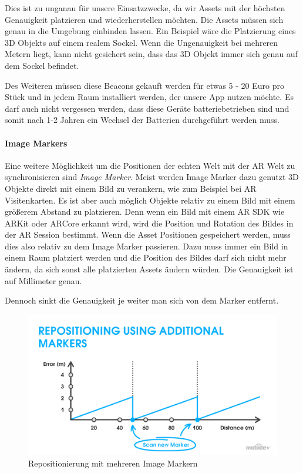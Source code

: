 \documentclass[titlepage, a4paper, 11pt]{scrartcl}
\begin{document}
  Dies ist zu unganau für unsere Einsatzzwecke, da wir Assets mit der höchsten Genauigkeit platzieren und wiederherstellen möchten. Die Assets müssen sich genau in die Umgebung einbinden lassen.
  Ein Beispiel wäre die Platzierung eines 3D Objekts auf einem realem Sockel. Wenn die Ungenauigkeit bei mehreren Metern liegt, kann nicht gesichert sein, dass das 3D Objekt immer sich genau auf dem Sockel befindet.

  Des Weiteren müssen diese Beacons gekauft werden für etwas 5 - 20 Euro pro Stück und in jedem Raum installiert werden, der unsere App nutzen möchte.
  Es darf auch nicht vergessen werden, dass diese Geräte batteriebetrieben sind und somit nach 1-2 Jahren ein Wechsel der Batterien durchgeführt werden muss. 

  \paragraph{Image Markers}

  Eine weitere Möglichkeit um die Positionen der echten Welt mit der AR Welt zu synchronisieren sind \textit{Image Marker}. Meist werden Image Marker dazu genutzt 3D Objekte direkt mit einem Bild zu verankern, wie zum Beispiel bei AR Visitenkarten.
  Es ist aber auch möglich Objekte relativ zu einem Bild mit einem größerem Abstand zu platzieren. Denn wenn ein Bild mit einem AR SDK wie ARKit oder ARCore erkannt wird, wird die Position und Rotation des Bildes in der AR Session bestimmt.
  Wenn die Asset Positionen gespeichert werden, muss dies also relativ zu dem Image Marker passieren. Dazu muss immer ein Bild in einem Raum platziert werden und die Position des Bildes darf sich nicht mehr ändern, da sich sonst alle platzierten Assets ändern würden.
  Die Genauigkeit ist auf Millimeter genau. \cite{HowAugme98:online}
  
  Dennoch sinkt die Genauigkeit je weiter man sich von dem Marker entfernt.

  \begin{figure}[h]
    \centering
    \includegraphics[width=.6\textwidth]{multi-marker}
    \caption{Repositionierung mit mehreren Image Markern \cite{HowAugme98:online}}
    \label{MultiMarker}
  \end{figure}
\end{document}
